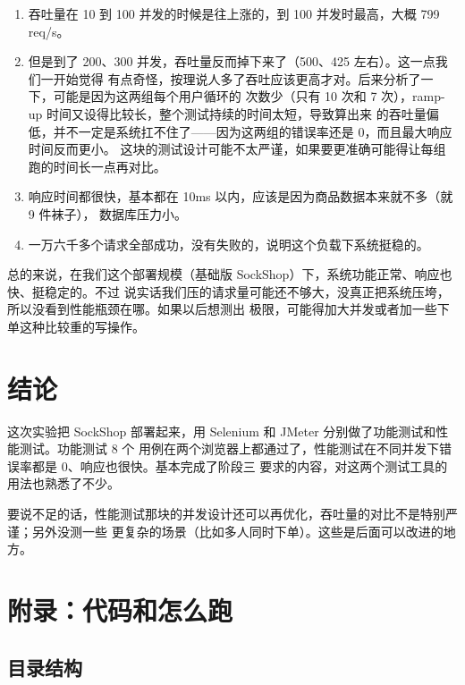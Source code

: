\documentclass[11pt,a4paper]{ctexart}
\begin{document}
\begin{enumerate}[leftmargin=2em]
  \item 吞吐量在 10 到 100 并发的时候是往上涨的，到 100 并发时最高，大概 799 req/s。
  \item 但是到了 200、300 并发，吞吐量反而掉下来了（500、425 左右）。这一点我们一开始觉得
  有点奇怪，按理说人多了吞吐应该更高才对。后来分析了一下，可能是因为这两组每个用户循环的
  次数少（只有 10 次和 7 次），ramp-up 时间又设得比较长，整个测试持续的时间太短，导致算出来
  的吞吐量偏低，并不一定是系统扛不住了——因为这两组的错误率还是 0，而且最大响应时间反而更小。
  这块的测试设计可能不太严谨，如果要更准确可能得让每组跑的时间长一点再对比。
  \item 响应时间都很快，基本都在 10ms 以内，应该是因为商品数据本来就不多（就 9 件袜子），
  数据库压力小。
  \item 一万六千多个请求全部成功，没有失败的，说明这个负载下系统挺稳的。
\end{enumerate}

总的来说，在我们这个部署规模（基础版 SockShop）下，系统功能正常、响应也快、挺稳定的。不过
说实话我们压的请求量可能还不够大，没真正把系统压垮，所以没看到性能瓶颈在哪。如果以后想测出
极限，可能得加大并发或者加一些下单这种比较重的写操作。

\section{结论}

这次实验把 SockShop 部署起来，用 Selenium 和 JMeter 分别做了功能测试和性能测试。功能测试 8 个
用例在两个浏览器上都通过了，性能测试在不同并发下错误率都是 0、响应也很快。基本完成了阶段三
要求的内容，对这两个测试工具的用法也熟悉了不少。

要说不足的话，性能测试那块的并发设计还可以再优化，吞吐量的对比不是特别严谨；另外没测一些
更复杂的场景（比如多人同时下单）。这些是后面可以改进的地方。

\section{附录：代码和怎么跑}

\subsection{目录结构}
\end{document}
